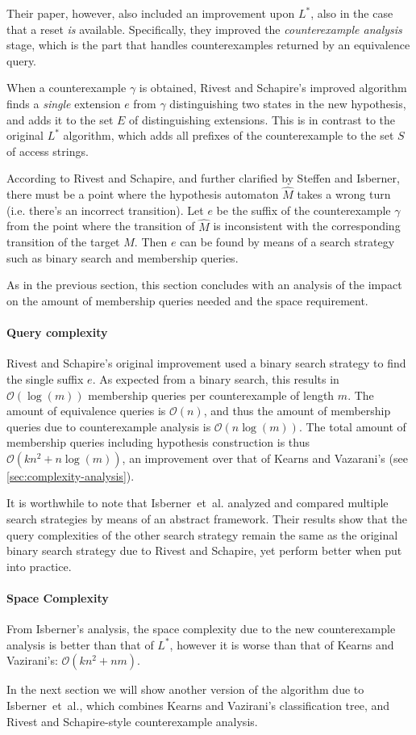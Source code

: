 \documentclass[multi,crop=false,class=article]{standalone}
\begin{document}
Their paper, however, also included an improvement upon $L^*$, also in the case
that a reset \textit{is} available. Specifically, they improved the
\textit{counterexample analysis} stage, which is the part that handles
counterexamples returned by an equivalence query.

When a counterexample $\gamma$ is obtained, Rivest and Schapire's improved
algorithm finds a \textit{single} extension $e$ from $\gamma$ distinguishing two
states in the new hypothesis, and adds it to the set $E$ of distinguishing
extensions. This is in contrast to the original $L^*$ algorithm, which adds all
prefixes of the counterexample to the set $S$ of access strings.

According to Rivest and Schapire\cite{Rivest1993}, and further clarified by
Steffen\cite{Steffen2011} and Isberner\cite{Isberner2014a}, there must be a
point where the hypothesis automaton $\hat M$ takes a wrong turn (i.e. there's
an incorrect transition). Let $e$ be the suffix of the counterexample $\gamma$
from the point where the transition of $\hat M$ is inconsistent with the
corresponding transition of the target $M$. Then $e$ can be found by means of a
search strategy such as binary search and membership queries.

As in the previous section, this section concludes with an analysis of the
impact on the amount of membership queries needed and the space requirement.

\paragraph{Query complexity} Rivest and Schapire's original improvement used a
binary search strategy to find the single suffix $e$. As expected from a binary
search, this results in $\mathcal{O}(\log(m))$ membership queries per
counterexample of length $m$. The amount of equivalence queries is
$\mathcal{O}(n)$, and thus the amount of membership queries due to
counterexample analysis is $\mathcal{O}(n\log(m))$. The total amount of
membership queries including hypothesis construction is thus
$\mathcal{O}(kn^2 + n\log(m))$, an improvement over that of Kearns and
Vazarani's (see \cref{sec:complexity-analysis}).

It is worthwhile to note that Isberner~et~al. analyzed and compared multiple
search strategies by means of an abstract framework\cite{Isberner2014a}. Their
results show that the query complexities of the other search strategy remain the
same as the original binary search strategy due to Rivest and Schapire, yet
perform better when put into practice.

\paragraph{Space Complexity} From Isberner's analysis\cite{Isberner2014b}, the
space complexity due to the new counterexample analysis is better than that of
$L^*$, however it is worse than that of Kearns and Vazirani's:
$\mathcal{O}(kn^2 + nm)$.

In the next section we will show another version of the algorithm due to
Isberner~et~al., which combines Kearns and Vazirani's classification tree, and
Rivest and Schapire-style counterexample analysis.  
\end{document}

